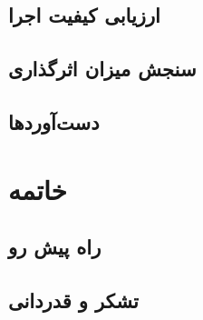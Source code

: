 \documentclass[a4paper,notitlepage]{report}
\begin{document}
\section{ارزیابی کیفیت اجرا} 
\section{سنجش میزان اثرگذاری}
\section{دست‌آوردها}
\chapter{خاتمه}
\section{راه پیش رو}
\section{تشکر و قدردانی}
\end{document}
